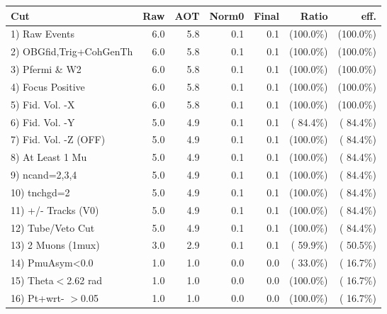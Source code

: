  \begin{table}[h!]\centering
 \begin{tabular}{||l||r|r|r|r|r|r||}
 \hline
 \hline
 Cut & Raw & AOT & Norm0 & Final & Ratio & eff.       \\
 \hline
  1) Raw Events           &          6.0 &          5.8 &          0.1 &          0.1 & (100.0\%) & (100.0\%) \\
  2) OBGfid,Trig+CohGenTh &          6.0 &          5.8 &          0.1 &          0.1 & (100.0\%) & (100.0\%) \\
  3) Pfermi \& W2         &          6.0 &          5.8 &          0.1 &          0.1 & (100.0\%) & (100.0\%) \\
  4) Focus Positive       &          6.0 &          5.8 &          0.1 &          0.1 & (100.0\%) & (100.0\%) \\
  5) Fid. Vol. -X         &          6.0 &          5.8 &          0.1 &          0.1 & (100.0\%) & (100.0\%) \\
  6) Fid. Vol. -Y         &          5.0 &          4.9 &          0.1 &          0.1 & ( 84.4\%) & ( 84.4\%) \\
  7) Fid. Vol. -Z (OFF)   &          5.0 &          4.9 &          0.1 &          0.1 & (100.0\%) & ( 84.4\%) \\
  8) At Least 1 Mu        &          5.0 &          4.9 &          0.1 &          0.1 & (100.0\%) & ( 84.4\%) \\
  9) ncand=2,3,4          &          5.0 &          4.9 &          0.1 &          0.1 & (100.0\%) & ( 84.4\%) \\
 10) tnchgd=2             &          5.0 &          4.9 &          0.1 &          0.1 & (100.0\%) & ( 84.4\%) \\
 11) +/- Tracks (V0)      &          5.0 &          4.9 &          0.1 &          0.1 & (100.0\%) & ( 84.4\%) \\
 12) Tube/Veto Cut        &          5.0 &          4.9 &          0.1 &          0.1 & (100.0\%) & ( 84.4\%) \\
 13) 2 Muons (1mux)       &          3.0 &          2.9 &          0.1 &          0.1 & ( 59.9\%) & ( 50.5\%) \\
 14) PmuAsym<0.0          &          1.0 &          1.0 &          0.0 &          0.0 & ( 33.0\%) & ( 16.7\%) \\
 15) Theta$<$2.62 rad     &          1.0 &          1.0 &          0.0 &          0.0 & (100.0\%) & ( 16.7\%) \\
 16) Pt+wrt- $>$0.05      &          1.0 &          1.0 &          0.0 &          0.0 & (100.0\%) & ( 16.7\%) \\

\end{tabular}
\end{table}
